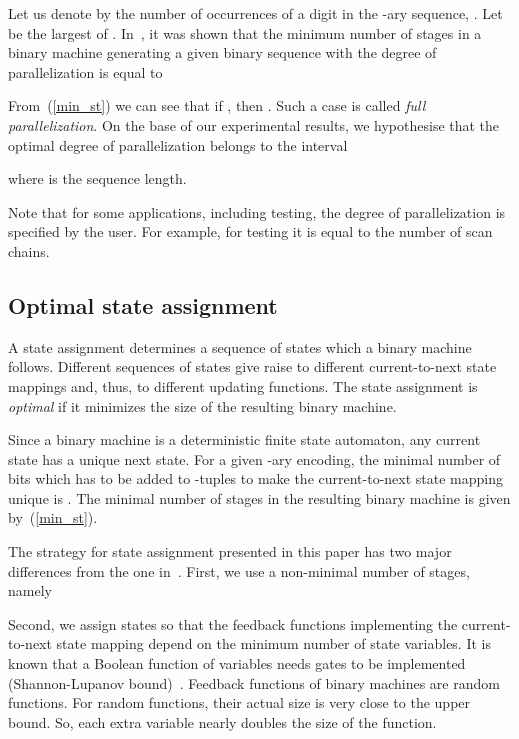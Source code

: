 \documentclass[10pt,conference]{IEEEtran}
\begin{document}
Let us denote by  the number of occurrences of a digit  in the -ary sequence,
. Let  be the largest of . In~\cite{Du11a}, it was shown that the minimum number of stages in a binary machine generating a given binary sequence with the degree 
of parallelization  is equal to 



From~(\ref{min_st}) we can see that if ,
then . Such a case is called {\em full parallelization}. 
On the base of our experimental results, we hypothesise that
the optimal degree of parallelization belongs to the interval

where  is the sequence length.

Note that for some applications, including testing,
the degree of parallelization is specified by the user.
For example, for testing it is equal to the number of scan chains. 

\subsection{Optimal state assignment}

A state assignment determines a sequence of states which a binary machine follows.
Different sequences of states give raise to different current-to-next state
mappings and, thus, to different updating functions. 
The state assignment is {\em optimal} if it minimizes the size 
of the resulting binary machine. 

Since a binary machine is a deterministic finite state automaton, any current state has a unique next state.
For a given -ary encoding, the minimal number of bits which 
has to be added to -tuples  
to make the current-to-next state mapping unique
is . The minimal number of stages 
in the resulting binary machine is given by~(\ref{min_st}).

The strategy for state assignment presented in this paper 
has two major differences from the one in~\cite{Du11a}.
First, we use a non-minimal number of stages, namely



Second, we assign states so that the feedback functions implementing the current-to-next
state mapping depend on the minimum number of state variables.
It is known that a Boolean function of  variables 
needs  gates to be implemented (Shannon-Lupanov bound)~\cite{We87}.
Feedback functions of binary machines are random functions. 
For random functions, their actual size is very close to the upper bound.
So, each extra variable nearly doubles the size of the function.
\end{document}
